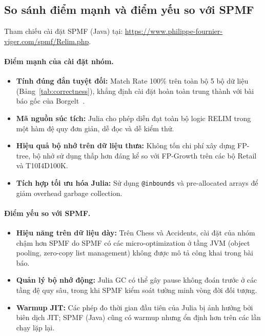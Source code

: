 \documentclass[12pt,a4paper]{report}
\begin{document}
\subsection{So sánh điểm mạnh và điểm yếu so với SPMF}

Tham chiếu cài đặt SPMF (Java) tại:
\url{https://www.philippe-fournier-viger.com/spmf/Relim.php}.

\paragraph{Điểm mạnh của cài đặt nhóm.}
\begin{itemize}
    \item \textbf{Tính đúng đắn tuyệt đối:} Match Rate 100\% trên toàn bộ 5 bộ
          dữ liệu (Bảng~\ref{tab:correctness}), khẳng định cài đặt hoàn toàn trung
          thành với bài báo gốc của Borgelt~\cite{borgelt2005}.
    \item \textbf{Mã nguồn súc tích:} Julia cho phép diễn đạt toàn bộ logic RELIM
          trong một hàm đệ quy đơn giản, dễ đọc và dễ kiểm thử.
    \item \textbf{Hiệu quả bộ nhớ trên dữ liệu thưa:} Không tốn chi phí xây dựng
          FP-tree, bộ nhớ sử dụng thấp hơn đáng kể so với FP-Growth trên các bộ
          Retail và T10I4D100K.
    \item \textbf{Tích hợp tối ưu hóa Julia:} Sử dụng \texttt{@inbounds} và
          pre-allocated arrays để giảm overhead garbage collection.
\end{itemize}

\paragraph{Điểm yếu so với SPMF.}
\begin{itemize}
    \item \textbf{Hiệu năng trên dữ liệu dày:} Trên Chess và Accidents, cài đặt
          của nhóm chậm hơn SPMF do SPMF có các micro-optimization ở tầng JVM
          (object pooling, zero-copy list management) không được mô tả công khai
          trong bài báo.
    \item \textbf{Quản lý bộ nhớ động:} Julia GC có thể gây pause không đoán trước
          ở các tầng đệ quy sâu, trong khi SPMF kiểm soát tường minh vòng đời đối tượng.
    \item \textbf{Warmup JIT:} Các phép đo thời gian đầu tiên của Julia bị ảnh hưởng
          bởi biên dịch JIT; SPMF (Java) cũng có warmup nhưng ổn định hơn trên các
          lần chạy lặp lại.
\end{itemize}
\end{document}
